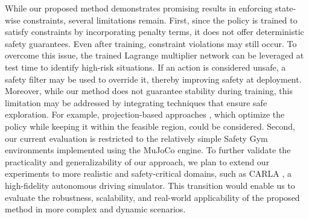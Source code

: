 While our proposed method demonstrates promising results in enforcing state-wise constraints, several limitations remain.
First, since the policy is trained to satisfy constraints by incorporating penalty terms, it does not offer deterministic safety guarantees.
Even after training, constraint violations may still occur.
To overcome this issue, the trained Lagrange multiplier network can be leveraged at test time to identify high-risk situations.
If an action is considered unsafe, a safety filter may be used to override it, thereby improving safety at deployment.
Moreover, while our method does not guarantee stability during training, this limitation may be addressed by integrating techniques that ensure safe exploration.
For example, projection-based approaches \cite{CPO, PCPO}, which optimize the policy while keeping it within the feasible region, could be considered.
Second, our current evaluation is restricted to the relatively simple Safety Gym environments implemented using the MuJoCo engine.
To further validate the practicality and generalizability of our approach, we plan to extend our experiments to more realistic and safety-critical domains, such as CARLA \cite{CARLA}, a high-fidelity autonomous driving simulator.
This transition would enable us to evaluate the robustness, scalability, and real-world applicability of the proposed method in more complex and dynamic scenarios.